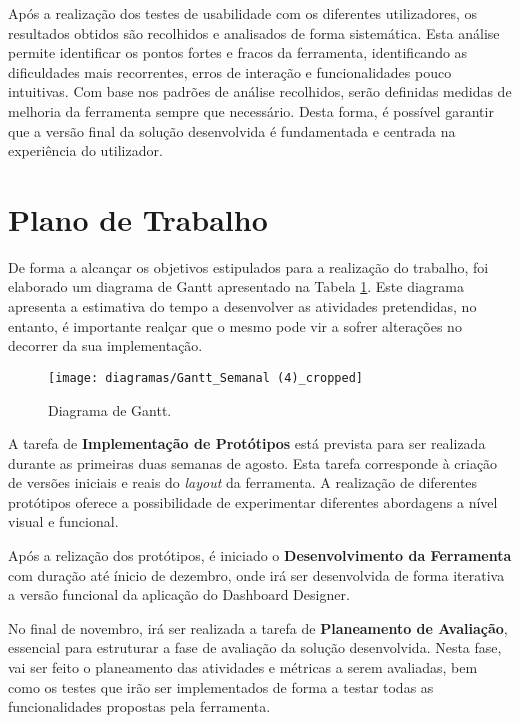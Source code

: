 Após a realização dos testes de usabilidade com os diferentes utilizadores, os resultados obtidos são recolhidos e analisados de forma sistemática. Esta análise permite identificar os pontos fortes e fracos da ferramenta, identificando as dificuldades mais recorrentes, erros de interação e funcionalidades pouco intuitivas. Com base nos padrões de análise recolhidos, serão definidas medidas de melhoria da ferramenta sempre que necessário. Desta forma, é possível garantir que a versão final da solução desenvolvida é fundamentada e centrada na experiência do utilizador.

\section{Plano de Trabalho} %
\label{sec:plano_trabalho}

De forma a alcançar os objetivos estipulados para a realização do trabalho, foi elaborado um diagrama de Gantt apresentado na Tabela \ref{tab:ganttchart}. Este diagrama apresenta a estimativa do tempo a desenvolver as atividades pretendidas, no entanto, é importante realçar que o mesmo pode vir a sofrer alterações no decorrer da sua implementação.

\begin{figure}[htbp]
  \texttt{[image: diagramas/Gantt\_Semanal (4)\_cropped]}
  \centering
  \caption{Diagrama de Gantt.}
  \label{tab:ganttchart}
\end{figure}

A tarefa de \textbf{Implementação de Protótipos} está prevista para ser realizada durante as primeiras duas semanas de agosto. Esta tarefa corresponde à criação de versões iniciais e reais do \textit{layout} da ferramenta. A realização de diferentes protótipos oferece a possibilidade de experimentar diferentes abordagens a nível visual e funcional.

Após a relização dos protótipos, é iniciado o \textbf{Desenvolvimento da Ferramenta} com duração até ínicio de dezembro, onde irá ser desenvolvida de forma iterativa a versão funcional da aplicação do Dashboard Designer. 

No final de novembro, irá ser realizada a tarefa de \textbf{Planeamento de Avaliação}, essencial para estruturar a fase de avaliação da solução desenvolvida. Nesta fase, vai ser feito o planeamento das atividades e métricas a serem avaliadas, bem como os testes que irão ser implementados de forma a testar todas as funcionalidades propostas pela ferramenta.

